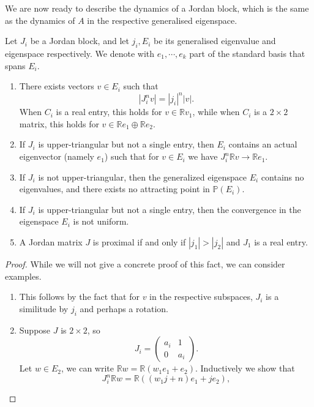 \documentclass{report}
\begin{document}
We are now ready to describe the dynamics of a Jordan block, which is the same as the dynamics of $A$ in the respective generalised eigenspace.
\begin{lemma}
    Let $J_i$ be a Jordan block, and let $j_i, E_i$ be its generalised eigenvalue and eigenspace respectively.
    We denote with $e_1, \cdots, e_k$ part of the standard basis that spans $E_i$.
    \begin{enumerate}[label=(\roman*)]
        \item There exists vectors $v \in E_i$ such that
        \[
        |J_i^n v| = |j_i|^n |v|.
        \]
        When $C_i$ is a real entry, this holds for $v \in \mathbb Rv_1$, while when $C_i$ is a $2 \times 2$ matrix, this holds for $v \in \mathbb R e_1 \oplus \mathbb R e_2$.
        \item If $J_i$ is upper-triangular but not a single entry, then $E_i$ contains an actual eigenvector (namely $e_1$) such that for $v \in E_i$ we have $J_i^n \mathbb Rv \to \mathbb Re_1$.
        \item If $J_i$ is not upper-triangular, then the generalized eigenspace $E_i$ contains no eigenvalues, and there exists no attracting point in $\mathbb P(E_i)$.
        \item If $J_i$ is upper-triangular but not a single entry, then the convergence in the eigenspace $E_i$ is not uniform.
        \item A Jordan matrix $J$ is proximal if and only if $|j_1| > |j_2|$ and $J_1$ is a real entry.
    \end{enumerate}
    \begin{proof}
        While we will not give a concrete proof of this fact, we can consider examples.
        \begin{enumerate}[label=(\roman*)]
            \item This follows by the fact that for $v$ in the respective subspaces, $J_i$ is a similitude by $j_i$ and perhaps a rotation.
            \item 
            Suppose $J$ is $2\times 2$, so
            \[
            J_i = \begin{pmatrix}
                a_i & 1 \\
                0 & a_i
            \end{pmatrix}.
            \]
            Let $w \in E_2$, we can write $\mathbb R w = \mathbb R(w_1 e_1 + e_2)$.
            Inductively we show that 
            \[
            J_i^n \mathbb R w = \mathbb R((w_1 j + n)e_1 + j e_2),
\]
\end{enumerate}
\end{proof}
\end{lemma}
\end{document}
